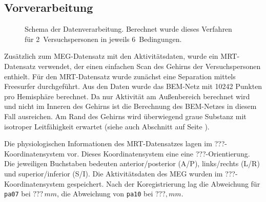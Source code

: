 \documentclass[doc,a4paper,12pt]{apa6}
\makeatletter
\DeclareRobustCommand*{\nameref}[1]{%
      \glqq{\myorg@nameref{#1}}\grqq%
    }%
\makeatother
\begin{document}
\subsection{Vorverarbeitung}

\begin{figure}
  \centering
  \setlength{\fboxsep}{5mm}
  \vspace*{3mm}
  \caption[Schema der Datenverarbeitung]{Schema der Datenverarbeitung. Berechnet wurde dieses Verfahren für 2~Versuchspersonen in jeweils 6~Bedingungen.}
  \label{img:verfahren}
\end{figure}

Zusätzlich zum MEG-Datensatz mit den Aktivitätsdaten, wurde ein MRT-Datensatz verwendet, der einen einfachen Scan des Gehirns der Versuchspersonen enthielt. Für den MRT-Datensatz wurde zunächst eine Separation mittels Freesurfer durchgeführt. Aus den Daten wurde das BEM-Netz mit 10242 Punkten pro Hemisphäre berechnet. Da nur Aktivität am Außenbereich berechnet wird und nicht im Inneren des Gehirns ist die Berechnung des BEM-Netzes in diesem Fall ausreichen. Am Rand des Gehirns wird überwiegend graue Substanz mit isotroper Leitfähigkeit erwartet (siehe auch Abschnitt \nameref{sec:segment} auf Seite \pageref{sec:segment}).

Die physiologischen Informationen des MRT-Datensatzes lagen im ???-Koordinatensystem vor. Dieses Koordinatensystem eine eine ???-Orientierung. Die jeweiligen Buchstaben bedeuten anterior/posterior (A/P), links/rechts (L/R) und superior/inferior (S/I). Die Aktivitätsdaten des MEG wurden im ???-Koordinatensystem gespeichert. Nach der Koregistrierung lag die Abweichung für \texttt{pa07} bei $???\,mm$, die Abweichung von \texttt{pa10} bei $???,mm$.
\end{document}

